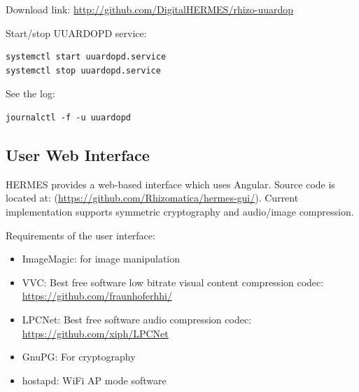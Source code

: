 \documentclass[11pt,a4paper]{article}
\begin{document}
Download link: \url{http://github.com/DigitalHERMES/rhizo-uuardop}

Start/stop UUARDOPD service:
\begin{verbatim}
systemctl start uuardopd.service
systemctl stop uuardopd.service
\end{verbatim}


See the log:
\begin{verbatim}
journalctl -f -u uuardopd
\end{verbatim}





\subsection{User Web Interface}

HERMES provides a web-based interface which uses Angular. Source
code is located at:
(\url{https://github.com/Rhizomatica/hermes-gui/}). Current
implementation supports symmetric cryptography and audio/image compression.


Requirements of the user interface:

\begin{itemize}
\item ImageMagic: for image manipulation
\item VVC: Best free software low bitrate visual content compression codec: \url{https://github.com/fraunhoferhhi/}
\item LPCNet: Best free software audio compression codec: \url{https://github.com/xiph/LPCNet}
\item GnuPG: For cryptography
\item hostapd: WiFi AP mode software
\end{itemize}
\end{document}
